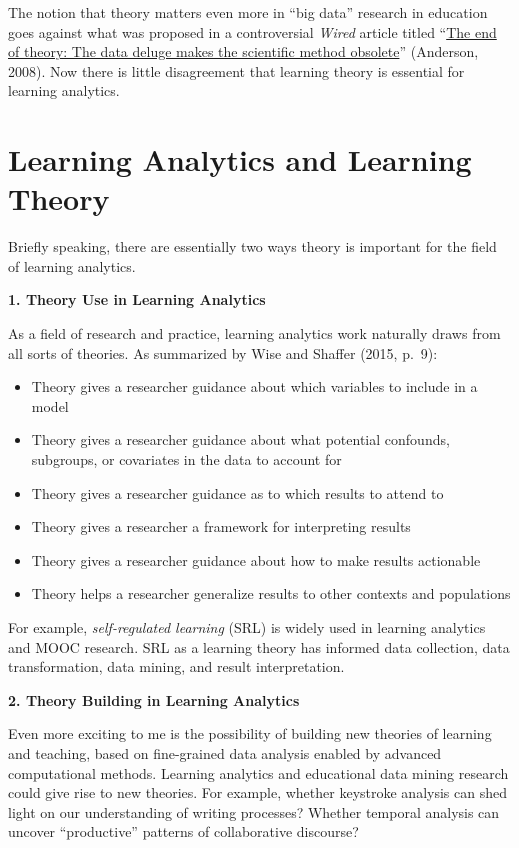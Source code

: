 \documentclass[
]{book}
\providecommand{\tightlist}{%
  \setlength{\itemsep}{0pt}\setlength{\parskip}{0pt}}
\begin{document}
The notion that theory matters even more in ``big data'' research in education goes against what was proposed in a controversial \emph{Wired} article titled ``\href{https://www.wired.com/2008/06/pb-theory/}{The end of theory: The data deluge makes the scientific method obsolete}'' (Anderson, 2008). Now there is little disagreement that learning theory is essential for learning analytics.

\hypertarget{learning-analytics-and-learning-theory}{%
\section{Learning Analytics and Learning Theory}\label{learning-analytics-and-learning-theory}}

Briefly speaking, there are essentially two ways theory is important for the field of learning analytics.

\textbf{1. Theory Use in Learning Analytics}

As a field of research and practice, learning analytics work naturally draws from all sorts of theories. As summarized by Wise and Shaffer (2015, p.~9):

\begin{itemize}
\tightlist
\item
  Theory gives a researcher guidance about which variables to include in a model
\item
  Theory gives a researcher guidance about what potential confounds, subgroups, or covariates in the data to account for
\item
  Theory gives a researcher guidance as to which results to attend to
\item
  Theory gives a researcher a framework for interpreting results
\item
  Theory gives a researcher guidance about how to make results actionable
\item
  Theory helps a researcher generalize results to other contexts and populations
\end{itemize}

For example, \emph{self-regulated learning} (SRL) is widely used in learning analytics and MOOC research. SRL as a learning theory has informed data collection, data transformation, data mining, and result interpretation.

\textbf{2. Theory Building in Learning Analytics}

Even more exciting to me is the possibility of building new theories of learning and teaching, based on fine-grained data analysis enabled by advanced computational methods. Learning analytics and educational data mining research could give rise to new theories. For example, whether keystroke analysis can shed light on our understanding of writing processes? Whether temporal analysis can uncover ``productive'' patterns of collaborative discourse?
\end{document}
